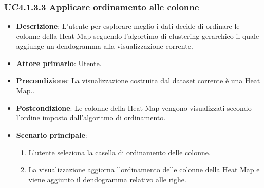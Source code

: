 \subsubsection{UC4.1.3.3 Applicare ordinamento alle colonne}
\label{subsec:uc4.1.3.3}
\begin{itemize}
    \item \textbf{Descrizione}: L’utente per esplorare meglio i dati decide di ordinare le colonne della Heat Map
                                seguendo l'algortimo di clustering gerarchico il quale aggiunge un dendogramma alla visualizzazione corrente.
	
    \item \textbf{Attore primario}: Utente.
    
    \item \textbf{Precondizione}:   La visualizzazione costruita dal dataset corrente è una Heat Map..
    \item \textbf{Postcondizione}:  Le colonne della Heat Map vengono visualizzati secondo l'ordine imposto dall'algoritmo di ordinamento.

	\item \textbf{Scenario principale}:
        \begin{enumerate}
            \item   L'utente seleziona la casella di ordinamento delle colonne.
            \item   La visualizzazione aggiorna l'ordinamento delle colonne della Heat Map 
                    e viene aggiunto il dendogramma relativo alle righe.
        \end{enumerate}
\end{itemize}


